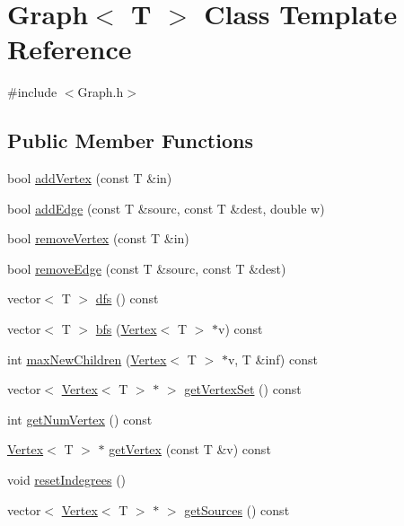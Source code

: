 \hypertarget{class_graph}{}\section{Graph$<$ T $>$ Class Template Reference}
\label{class_graph}


{\ttfamily \#include $<$Graph.\+h$>$}

\subsection*{Public Member Functions}
\begin{DoxyCompactItemize}
\item 
bool \hyperlink{class_graph_a00be284ea2be3b3d0f0d2e493b70245b}{add\+Vertex} (const T \&in)
\item 
bool \hyperlink{class_graph_ac61af3aafe6277215f5a3b3cc7d58ce2}{add\+Edge} (const T \&sourc, const T \&dest, double w)
\item 
bool \hyperlink{class_graph_af9c903104ad69a7782979fa9caedf163}{remove\+Vertex} (const T \&in)
\item 
bool \hyperlink{class_graph_a1106092a37366486cf55576f9ec01692}{remove\+Edge} (const T \&sourc, const T \&dest)
\item 
vector$<$ T $>$ \hyperlink{class_graph_a3f62ba0e37c5c011299c93d60e3a8be3}{dfs} () const 
\item 
vector$<$ T $>$ \hyperlink{class_graph_a0e9598b98be2570eb432690411a577e8}{bfs} (\hyperlink{class_vertex}{Vertex}$<$ T $>$ $\ast$v) const 
\item 
int \hyperlink{class_graph_ab8fd74c3cf8dca6eaa82d39fd1216f52}{max\+New\+Children} (\hyperlink{class_vertex}{Vertex}$<$ T $>$ $\ast$v, T \&inf) const 
\item 
vector$<$ \hyperlink{class_vertex}{Vertex}$<$ T $>$ $\ast$ $>$ \hyperlink{class_graph_ab7dc5ec1c34df811d560021b726e95ec}{get\+Vertex\+Set} () const 
\item 
int \hyperlink{class_graph_a295932f117d92c825a97ec458e0fb332}{get\+Num\+Vertex} () const 
\item 
\hyperlink{class_vertex}{Vertex}$<$ T $>$ $\ast$ \hyperlink{class_graph_a08a95472b0d9bd7321660940807af060}{get\+Vertex} (const T \&v) const 
\item 
void \hyperlink{class_graph_af34eb86d804272e6e3e221a9ed688c53}{reset\+Indegrees} ()
\item 
vector$<$ \hyperlink{class_vertex}{Vertex}$<$ T $>$ $\ast$ $>$ \hyperlink{class_graph_aa1a3c754f51a888e25dff2b26dfb85fc}{get\+Sources} () const 

\end{DoxyCompactItemize}
